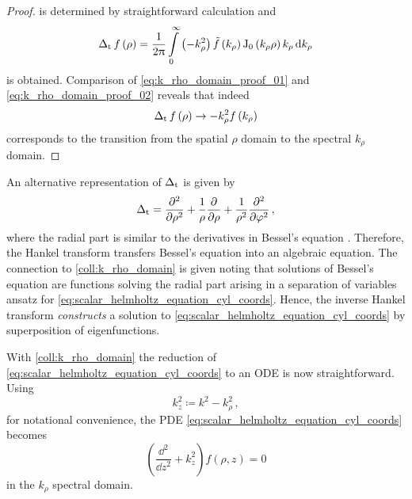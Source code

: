 \begin{proof}
	is determined by straightforward calculation and
	\begin{equation}\label{eq:k_rho_domain_proof_02}
		\operatorname{\operatorname{\Delta}_\mathrm{t}}
		f \left(\rho\right) =
		\frac{1}{2\uppi}
		\int\limits_{0}^{\infty} 
		\left( -k_\rho^2 \right)
		\tilde{f} \left(k_\rho\right) 
		\operatorname{J}_{0}\left(k_\rho \rho\right)
		k_\rho
		\, 
		\mathrm{d} k_\rho
	\end{equation}
	is obtained.
	Comparison of \eqref{eq:k_rho_domain_proof_01} and
	\eqref{eq:k_rho_domain_proof_02} reveals that indeed
	\begin{equation}
		\operatorname{\operatorname{\Delta}_\mathrm{t}}
		f \left(\rho\right)
		\to
		-k_\rho^2 
		f \left(k_\rho\right)
	\end{equation}
	corresponds to the transition from the spatial $\rho$ domain to the spectral
	$k_\rho$ domain.
\end{proof}

\begin{remark}
	An alternative representation of $\operatorname{\operatorname{\Delta}_\mathrm{t}}$ is given by
	\cite[(1.5.15)]{Olver2010}
	\begin{equation}
		\operatorname{\operatorname{\Delta}_\mathrm{t}} =
		\frac{\partial^2}{\partial \rho^2} + 
		\frac{1}{\rho}
		\frac{\partial}{\partial \rho} + 
		\frac{1}{\rho^2}
		\frac{\partial^2}{\partial \varphi^2}
		\, ,
	\end{equation}
	where the radial part is similar to the derivatives in Bessel's equation
	\cite[(10.2.1)]{Olver2010}.
	Therefore, the Hankel transform transfers Bessel's equation into an
	algebraic equation.
	The connection to \cref{coll:k_rho_domain} is given noting that 
	solutions of Bessel's equation are functions solving the radial part arising
	in a separation of variables ansatz for
	\eqref{eq:scalar_helmholtz_equation_cyl_coords}.
	Hence, the inverse Hankel transform \emph{constructs} a solution to
	\eqref{eq:scalar_helmholtz_equation_cyl_coords} by superposition of
	eigenfunctions.
\end{remark}

With \cref{coll:k_rho_domain} the reduction of
\eqref{eq:scalar_helmholtz_equation_cyl_coords} to an \ac{ODE} is now
straightforward.
Using
\begin{equation}
	k_z^2 \coloneqq k^2 - k_\rho^2
	\, ,
\end{equation}
for notational convenience, the \ac{PDE}
\eqref{eq:scalar_helmholtz_equation_cyl_coords} becomes
\begin{equation}
	\left( \frac{\dd^2}{\dd z^2} + k_z^2 \right)
	f \left(\rho, z\right) = 0
\end{equation}
in the $k_\rho$ spectral domain.








